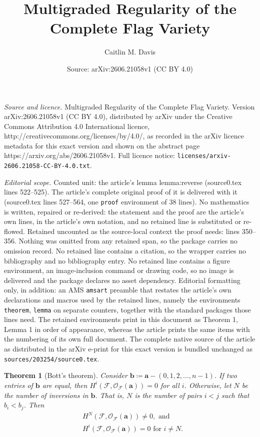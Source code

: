 \documentclass[10pt,a4paper]{amsart}
\title{Multigraded Regularity of the Complete Flag Variety}
\author{Caitlin M. Davis}
\date{Source: arXiv:2606.21058v1 (CC BY 4.0)}
\newtheorem{theorem}{Theorem}
\newcommand{\calF}{{\mathcal{F}}}
\newcommand{\calO}{{\mathcal{O}}}
\begin{document}
\maketitle

\noindent\emph{Source and licence.} Multigraded Regularity of the Complete Flag Variety. Version arXiv:2606.21058v1 (CC BY 4.0), distributed by arXiv under the Creative Commons Attribution 4.0 International licence, http://creativecommons.org/licenses/by/4.0/, as recorded in the arXiv licence metadata for this exact version and shown on the abstract page https://arxiv.org/abs/2606.21058v1. Full licence notice: \texttt{licenses/arxiv-2606.21058-CC-BY-4.0.txt}.\par\smallskip

\noindent\textit{Editorial scope.} Counted unit: the article's lemma lemma:reverse (source0.tex lines 522--525). The article's complete original proof of it is delivered with it (source0.tex lines 527--564, one \texttt{proof} environment of 38 lines). No mathematics is written, repaired or re-derived: the statement and the proof are the article's own lines, in the article's own notation, and no retained line is substituted or re-flowed.  Retained uncounted as the source-local context the proof needs: lines 350--356.  Nothing was omitted from any retained span, so the package carries no omission record.  No retained line contains a citation, so the wrapper carries no bibliography and no bibliography entry.  No retained line contains a figure environment, an image-inclusion command or drawing code, so no image is delivered and the package declares no asset dependency.  Editorial formatting only, in addition: an AMS \texttt{amsart} preamble that restates the article's own declarations and macros used by the retained lines, namely the environments \texttt{theorem}, \texttt{lemma} on separate counters, together with the standard packages those lines need.  The retained environments print in this document as Theorem 1, Lemma 1 in order of appearance, whereas the article prints the same items with the numbering of its own full document.  The complete native source of the article as distributed in the arXiv e-print for this exact version is bundled unchanged as \texttt{sources/203254/source0.tex}.
\begin{theorem}[Bott's theorem]\label{thm:bottAlternative}
    Consider $\mathbf b \coloneqq \mathbf a - (0,1,2,\ldots,n-1)$.  If two entries of $\mathbf b$ are equal, then $H^i(\calF,\calO_{\calF}(\mathbf a)) = 0 $ for all $i$.  Otherwise, let $N$ be the number of inversions in $\mathbf b$.  That is, $N$ is the number of pairs $i<j$ such that $b_i<b_j$.  Then
    \begin{align*}
    &H^N(\calF,\calO_{\calF}(\mathbf a)) \neq 0, \text{ and } \\
    &H^i(\calF,\calO_{\calF}(\mathbf a)) = 0 \text{ for } i\neq N.
    \end{align*}
\end{theorem}
\end{document}

